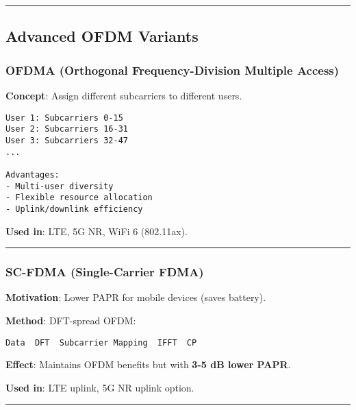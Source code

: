 \begin{center}\rule{0.5\linewidth}{0.5pt}\end{center}

\subsection{\texorpdfstring{ Advanced OFDM
Variants}{ Advanced OFDM Variants}}\label{advanced-ofdm-variants}

\subsubsection{OFDMA (Orthogonal Frequency-Division Multiple
Access)}\label{ofdma-orthogonal-frequency-division-multiple-access}

\textbf{Concept}: Assign different subcarriers to different users.

\begin{verbatim}
User 1: Subcarriers 0-15
User 2: Subcarriers 16-31
User 3: Subcarriers 32-47
...

Advantages:
- Multi-user diversity
- Flexible resource allocation
- Uplink/downlink efficiency
\end{verbatim}

\textbf{Used in}: LTE, 5G NR, WiFi 6 (802.11ax).

\begin{center}\rule{0.5\linewidth}{0.5pt}\end{center}

\subsubsection{SC-FDMA (Single-Carrier
FDMA)}\label{sc-fdma-single-carrier-fdma}

\textbf{Motivation}: Lower PAPR for mobile devices (saves battery).

\textbf{Method}: DFT-spread OFDM:

\begin{verbatim}
Data  DFT  Subcarrier Mapping  IFFT  CP
\end{verbatim}

\textbf{Effect}: Maintains OFDM benefits but with \textbf{3-5 dB lower
PAPR}.

\textbf{Used in}: LTE uplink, 5G NR uplink option.

\begin{center}\rule{0.5\linewidth}{0.5pt}\end{center}


